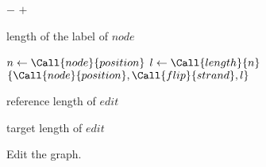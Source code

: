 \begin{algorithm}
\begin{algorithmic}
    \Return $-$
    \Else{}
    \Return $+$
    \EndIf
    \EndFunction

    \Return length of the label of $node$
    \EndFunction

    \State $n \gets \Call{node}{position}$
    \State $l \gets \Call{length}{n}$
    \Return $\{ \Call{node}{position}, \Call{flip}{strand}, l \}$
    \EndFunction

    \Return reference length of $edit$
    \EndFunction

    \Return target length of $edit$
    \EndFunction

  \end{algorithmic}
  \caption{Edit the graph.}
\end{algorithm}
